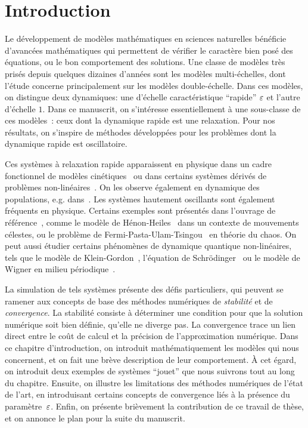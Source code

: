 \chapter*{Introduction}


Le développement de modèles mathématiques en sciences naturelles bénéficie d'avancées mathématiques qui permettent de vérifier le caractère bien posé des équations, ou le bon comportement des solutions. Une classe de modèles très prisés depuis quelques dizaines d'années sont les modèles multi-échelles, dont l'étude concerne principalement sur les modèles double-échelle. Dans ces modèles, on distingue deux dynamiques: une d'échelle caractéristique \enquote{rapide} $\varepsilon$ et l'autre d'échelle $1$. Dans ce manuscrit, on s'intéresse essentiellement à une sous-classe de ces modèles~: ceux dont la dynamique rapide est une relaxation. Pour nos résultats, on s'inspire de méthodes développées pour les problèmes dont la dynamique rapide est oscillatoire. 


Ces systèmes à relaxation rapide apparaissent en physique dans un cadre
fonctionnel de modèles cinétiques~\cite{bhatnagar.1954.model,
lemou.2008.new} ou dans certains systèmes dérivés de problèmes
non-linéaires~\cite{jin.1995.relaxation}. On les observe également en
dynamique des populations, e.g. dans~\cite{greiner.1994.singular,
auger.1996.emergence, sanchez.2000.singular, castella.2018.analysis}.
Les systèmes hautement oscillants sont également fréquents en physique.
Certains exemples sont présentés dans l'ouvrage de
référence~\cite[Chap.~I]{hairer.2006.geometric}, comme le modèle de
Hénon-Heiles~\cite{henon.1964.applicability} dans un contexte de
mouvements célestes, ou le problème de
Fermi-Pasta-Ulam-Tsingou~\cite{ford.1992.fermi} en théorie du chaos. On peut aussi étudier certains phénomènes
de dynamique quantique non-linéaires, tels que le modèle de
Klein-Gordon~\cite{bao.2012.analysis}, l'équation de
Schrödinger~\cite{grebert.2011.energy} ou le modèle de Wigner en milieu
périodique~\cite{crouseilles.2017.nonlinear, morandi.2011.wigner}.


La simulation de tels systèmes présente des défis particuliers, qui peuvent se ramener aux concepts de base des méthodes numériques de \textit{stabilité} et de \textit{convergence}. La stabilité consiste à déterminer une condition pour que la solution numérique soit bien définie, qu'elle ne diverge pas. La convergence trace un lien direct entre le coût de calcul et la précision de l'approximation numérique. Dans ce chapitre d'introduction, on introduit mathématiquement les modèles qui nous concernent, et on fait une brève description de leur comportement. À cet égard, on introduit deux exemples de systèmes \enquote{jouet} que nous suivrons tout au long du chapitre. Ensuite, on illustre les limitations des méthodes numériques de l'état de l'art, en introduisant certains concepts de convergence liés à la présence du paramètre~$\varepsilon$. Enfin, on présente brièvement la contribution de ce travail de thèse, et on annonce le plan pour la suite du manuscrit. 


